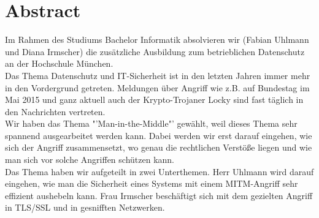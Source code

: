 \section*{Abstract}
Im Rahmen des Studiums Bachelor Informatik absolvieren wir (Fabian Uhlmann und Diana Irmscher) die zusätzliche Ausbildung zum betrieblichen Datenschutz an der Hochschule München.
\\
Das Thema Datenschutz und IT-Sicherheit ist in den letzten Jahren immer mehr in den Vordergrund getreten. Meldungen über Angriff wie z.B. auf Bundestag im Mai 2015 und ganz aktuell auch der Krypto-Trojaner Locky sind fast täglich in den Nachrichten vertreten.
\\	
Wir haben das Thema "'Man-in-the-Middle"' gewählt, weil dieses Thema sehr spannend ausgearbeitet werden kann.
Dabei werden wir erst darauf eingehen, wie sich der Angriff zusammensetzt, wo genau die rechtlichen Verstöße liegen und wie man sich vor solche Angriffen schützen kann.
\\	
Das Thema haben wir aufgeteilt in zwei Unterthemen.
Herr Uhlmann wird darauf eingehen, wie man die Sicherheit eines Systems mit einem MITM-Angriff sehr effizient aushebeln kann.
Frau Irmscher beschäftigt sich mit dem gezielten Angriff in TLS/SSL und in gesnifften Netzwerken.
{}
		 
